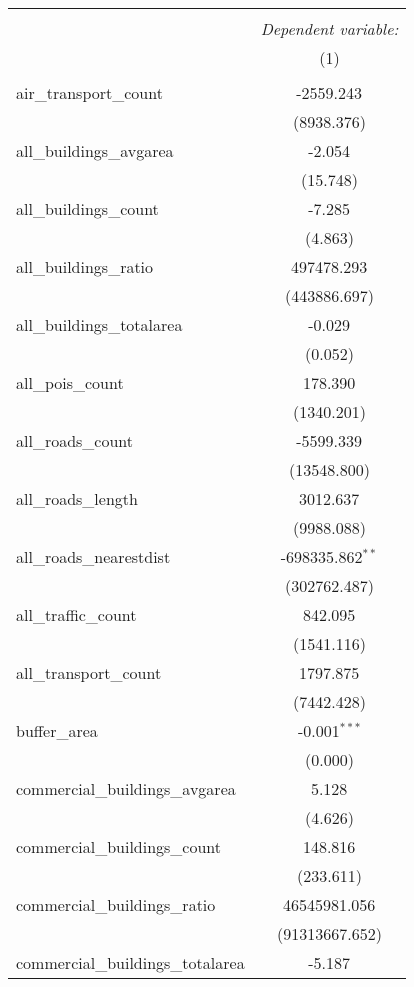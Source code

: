 \begin{table}[!htbp] \centering
\begin{tabular}{@{\extracolsep{5pt}}lc}
\\[-1.8ex]\hline
\hline \\[-1.8ex]
& \multicolumn{1}{c}{\textit{Dependent variable:}} \
\cr \cline{1-2}
\\[-1.8ex] & (1) \\
\hline \\[-1.8ex]
 air_transport_count & -2559.243$^{}$ \\
  & (8938.376) \\
 all_buildings_avgarea & -2.054$^{}$ \\
  & (15.748) \\
 all_buildings_count & -7.285$^{}$ \\
  & (4.863) \\
 all_buildings_ratio & 497478.293$^{}$ \\
  & (443886.697) \\
 all_buildings_totalarea & -0.029$^{}$ \\
  & (0.052) \\
 all_pois_count & 178.390$^{}$ \\
  & (1340.201) \\
 all_roads_count & -5599.339$^{}$ \\
  & (13548.800) \\
 all_roads_length & 3012.637$^{}$ \\
  & (9988.088) \\
 all_roads_nearestdist & -698335.862$^{**}$ \\
  & (302762.487) \\
 all_traffic_count & 842.095$^{}$ \\
  & (1541.116) \\
 all_transport_count & 1797.875$^{}$ \\
  & (7442.428) \\
 buffer_area & -0.001$^{***}$ \\
  & (0.000) \\
 commercial_buildings_avgarea & 5.128$^{}$ \\
  & (4.626) \\
 commercial_buildings_count & 148.816$^{}$ \\
  & (233.611) \\
 commercial_buildings_ratio & 46545981.056$^{}$ \\
  & (91313667.652) \\
 commercial_buildings_totalarea & -5.187$^{}$ \\

\end{tabular}
\end{table}
